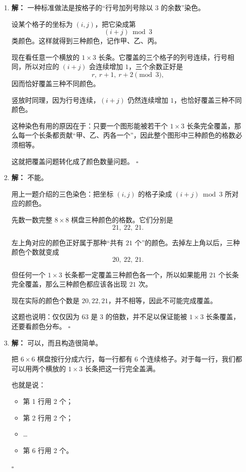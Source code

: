 \documentclass[11pt,a4paper,fontset=fandol]{ctexart}
\theoremstyle{formalexample}
\newenvironment{solution}{\par\noindent\textbf{解：}}{\hfill$\square$\par}
\begin{document}
\begin{enumerate}
  \item \begin{solution}
  一种标准做法是按格子的“行号加列号除以 $3$ 的余数”染色。

  设某个格子的坐标为 $(i,j)$，把它染成第
  \[
  (i+j)\bmod 3
  \]
  类颜色。这样就得到三种颜色，记作甲、乙、丙。

  现在看任意一个横放的 $1\times 3$ 长条。它覆盖的三个格子的列号连续，行号相同，所以对应的 $(i+j)$ 会连续增加 $1$，三个余数正好是
  \[
  r,\ r+1,\ r+2\pmod 3,
  \]
  因而恰好覆盖三种不同颜色。

  竖放时同理，因为行号连续，$(i+j)$ 仍然连续增加 $1$，也恰好覆盖三种不同颜色。

  这种染色有用的原因在于：只要一个图形能被若干个 $1\times 3$ 长条完全覆盖，那么每一个长条都贡献“甲、乙、丙各一个”，因此整个图形中三种颜色的格数必须相等。

  这就把覆盖问题转化成了颜色数量问题。
  \end{solution}

  \item \begin{solution}
  不能。

  用上一题介绍的三色染色：把坐标 $(i,j)$ 的格子染成 $(i+j)\bmod 3$ 所对应的颜色。

  先数一数完整 $8\times 8$ 棋盘三种颜色的格数。它们分别是
  \[
  21,\ 22,\ 21.
  \]

  左上角对应的颜色正好属于那种“共有 $21$ 个”的颜色。去掉左上角以后，三种颜色个数就变成
  \[
  20,\ 22,\ 21.
  \]

  但任何一个 $1\times 3$ 长条都一定覆盖三种颜色各一个，所以如果能用 $21$ 个长条完全覆盖，那么三种颜色都应该各出现 $21$ 次。

  现在实际的颜色个数是 $20,22,21$，并不相等，因此不可能完成覆盖。

  这题也说明：仅仅因为 $63$ 是 $3$ 的倍数，并不足以保证能被 $1\times 3$ 长条覆盖，还要看颜色分布。
  \end{solution}

  \item \begin{solution}
  可以，而且构造很简单。

  把 $6\times 6$ 棋盘按行分成六行，每一行都有 $6$ 个连续格子。对于每一行，我们都可以用两个横放的 $1\times 3$ 长条把这一行完全盖满。

  也就是说：
  \begin{itemize}
    \item 第 1 行用 2 个；
    \item 第 2 行用 2 个；
    \item \ldots
    \item 第 6 行用 2 个。
  \end{itemize}


\end{solution}
\end{enumerate}
\end{document}
